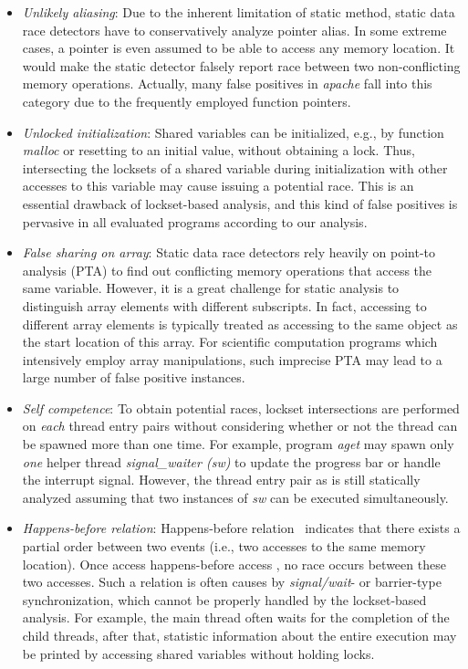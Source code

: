 \documentclass[10pt,onecolumn,letterpaper]{article}
\begin{document}
\begin{itemize}
\item \emph{Unlikely aliasing}: Due to the inherent limitation of static method,
static data race detectors have to conservatively analyze pointer
alias. In some extreme cases, a pointer is even assumed to be able
to access any memory location. It would make the static detector
falsely report race between two non-conflicting memory operations.
Actually, many false positives in \emph{apache} fall into this
category due to the frequently employed function pointers.
\item \emph{Unlocked initialization}: Shared variables can be initialized,
e.g., by function \emph{malloc} or resetting to an initial value,
without obtaining a lock. Thus, intersecting the locksets of a
shared variable during initialization with other accesses to this
variable may cause issuing a potential race. This is an essential
drawback of lockset-based analysis, and this kind of false positives
is pervasive in all evaluated programs according to our analysis.
\item \emph{False sharing on array}: Static data race detectors rely heavily on
point-to analysis (PTA) to find out conflicting memory operations
that access the same variable. However, it is a great challenge for
static analysis to distinguish array elements with different
subscripts. In fact, accessing to different array elements is
typically treated as accessing to the same object as the start
location of this array. For scientific computation programs which
intensively employ array manipulations, such imprecise PTA may lead
to a large number of false positive instances.
\item \emph{Self competence}: To obtain potential races, lockset intersections
are performed on \emph{each} thread entry pairs without considering
whether or not the thread can be spawned more than one time. For
example, program \emph{aget} may spawn only \emph{one} helper thread
\emph{signal\_waiter (sw)} to update the progress bar or handle the
interrupt signal. However, the thread entry pair as  is
still statically analyzed assuming that two instances of \emph{sw}
can be executed simultaneously.
\item \emph{Happens-before relation}: Happens-before relation~\cite{Lamport78CACM} indicates that there
exists a partial order between two events (i.e., two accesses to the
same memory location). Once access  happens-before access , no
race occurs between these two accesses. Such a relation is often
causes by \emph{signal/wait}- or barrier-type synchronization, which
cannot be properly handled by the lockset-based analysis. For
example, the main thread often waits for the completion of the child
threads, after that, statistic information about the entire
execution may be printed by accessing shared variables without
holding locks.
\end{itemize}
\end{document}
